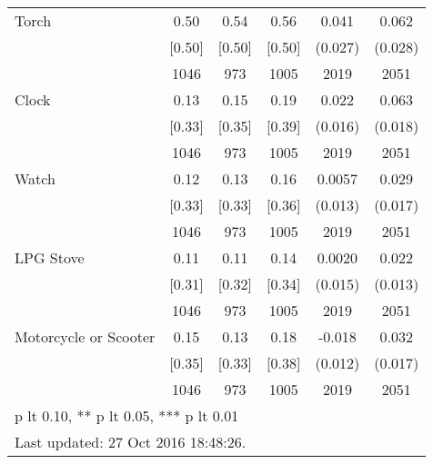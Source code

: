 \begin{table}[htbp]
\begin{tabular*}{0.9\hsize}{@{\hskip\tabcolsep\extracolsep\fill}l*{1}{ccccc}}
Torch                           &     0.50&     0.54&     0.56&    0.041         &    0.062\sym{**} \\
                                &   [0.50]&   [0.50]&   [0.50]&  (0.027)         &  (0.028)         \\
                                &     1046&      973&     1005&     2019         &     2051         \\
Clock                           &     0.13&     0.15&     0.19&    0.022         &    0.063\sym{***}\\
                                &   [0.33]&   [0.35]&   [0.39]&  (0.016)         &  (0.018)         \\
                                &     1046&      973&     1005&     2019         &     2051         \\
Watch                           &     0.12&     0.13&     0.16&   0.0057         &    0.029\sym{*}  \\
                                &   [0.33]&   [0.33]&   [0.36]&  (0.013)         &  (0.017)         \\
                                &     1046&      973&     1005&     2019         &     2051         \\
LPG Stove                       &     0.11&     0.11&     0.14&   0.0020         &    0.022\sym{*}  \\
                                &   [0.31]&   [0.32]&   [0.34]&  (0.015)         &  (0.013)         \\
                                &     1046&      973&     1005&     2019         &     2051         \\
Motorcycle or Scooter           &     0.15&     0.13&     0.18&   -0.018         &    0.032\sym{*}  \\
                                &   [0.35]&   [0.33]&   [0.38]&  (0.012)         &  (0.017)         \\
                                &     1046&      973&     1005&     2019         &     2051         \\
\bottomrule
\multicolumn{6}{l}{\footnotesize * p lt 0.10, ** p lt 0.05, *** p lt 0.01}\\
\multicolumn{6}{l}{\footnotesize Last updated: 27 Oct 2016 18:48:26.}\\
\end{tabular*}
\end{table}
